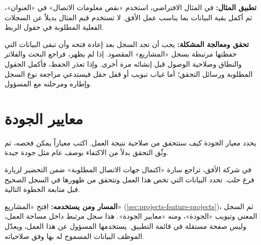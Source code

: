 \textbf{تطبيق المثال:} في المثال الافتراضي، استخدم «نقص معلومات الاتصال» في «العنوان»، ثم أكمل بقية البيانات بما يناسب عمل الأفق. لا تستخدم قيم المثال بديلاً عن السجلات الفعلية المطلوبة في حقول الربط.

\textbf{تحقق ومعالجة المشكلة:} يجب أن تجد السجل بعد إعادة فتحه وأن تبقى البيانات التي حفظتها مرتبطة بسجل «المشاريع» المقصود. إذا لم يظهر، فراجع البحث والفلاتر والنطاق وصلاحية الوصول قبل إنشائه مرة أخرى. وإذا تعذر الحفظ، فأكمل الحقول المطلوبة ورسائل التحقق؛ أما غياب تبويب أو قفل حقل فيستدعي مراجعة نوع السجل وإطاره ومرحلته مع المسؤول.

\clearpage
\section{معايير الجودة}
\label{sec:projects-feature-quality-criteria}

يحدد معيار الجودة كيف ستتحقق من صلاحية نتيجة العمل. اكتب معياراً يمكن فحصه، ثم وثّق التحقق بدلاً من الاكتفاء بوصف عام مثل جودة جيدة.

\begin{rcnote}
في شركة الأفق، تراجع سارة «اكتمال جهات الاتصال المطلوبة» ضمن التحضير لزيارة فرع حلب. تحدد البيانات التي تخص هذا العمل وتتحقق من ظهورها في السجل الصحيح قبل متابعة الخطوة التالية.
\end{rcnote}

\textbf{المسار ومن يستخدمه:} افتح «المشاريع» (\ref{sec:projects-feature-projects})، ثم السجل المعني وتبويب «الجودة»، ومنه «معايير الجودة». هذا سجل مرتبط داخل مساحة العمل، وليس صفحة مستقلة في قائمة التطبيق. يستخدمها المسؤول عن هذا العمل، ويعدّل الموظف البيانات المسموح له بها وفق صلاحياته.

